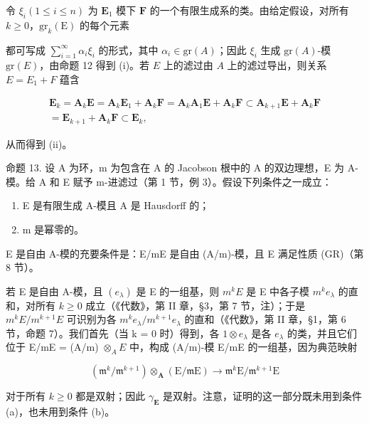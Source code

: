 	令 \(\xi_{i}(1\leqslant i\leqslant n)\) 为 \(\mathbf{E}_1\) 模下 \(\mathbf{F}\) 的一个有限生成系的类。由给定假设，对所有 \(k\geqslant 0\)，\(\mathrm{gr}_k(\mathrm{E})\) 的每个元素

	都可写成 \(\sum_{i=1}^{\infty} \alpha_i \xi_i\) 的形式，其中 \(\alpha_i \in \mathrm{gr}(A)\)；因此 \(\xi_i\) 生成 \(\mathrm{gr}(A)\)-模 \(\mathrm{gr}(E)\)，由命题 12 得到 (i)。若 \(E\) 上的滤过由 \(A\) 上的滤过导出，则关系 \(E = E_1 + F\) 蕴含

\[
\begin{array}{r} \mathbf {E} _ {k} = \mathbf {A} _ {k} \mathbf {E} = \mathbf {A} _ {k} \mathbf {E} _ {1} + \mathbf {A} _ {k} \mathbf {F} = \mathbf {A} _ {k} \mathbf {A} _ {1} \mathbf {E} + \mathbf {A} _ {k} \mathbf {F} \subset \mathbf {A} _ {k + 1} \mathbf {E} + \mathbf {A} _ {k} \mathbf {F} \\ = \mathbf {E} _ {k + 1} + \mathbf {A} _ {k} \mathbf {F} \subset \mathbf {E} _ {k}, \end{array}
\]

从而得到 (ii)。

命题 13. 设 A 为环，m 为包含在 A 的 Jacobson 根中的 A 的双边理想，E 为 A-模。给 A 和 E 赋予 m-进滤过（第 1 节，例 3）。假设下列条件之一成立：

\begin{enumerate}
\def\labelenumi{(\alph{enumi})}
\item
  E 是有限生成 A-模且 A 是 Hausdorff 的；
\item
  m 是幂零的。
\end{enumerate}

E 是自由 A-模的充要条件是：E/mE 是自由 (A/m)-模，且 E 满足性质 (GR)（第 8 节）。

	若 E 是自由 A-模，且 \((e_{\lambda})\) 是 E 的一组基，则 \(m^{k}E\) 是 E 中各子模 \(m^{k}e_{\lambda}\) 的直和，对所有 \(k \geqslant 0\) 成立（《代数》，第 II 章，§3，第 7 节，注）；于是 \(m^{k}E/m^{k+1}E\) 可识别为各 \(m^{k}e_{\lambda}/m^{k+1}e_{\lambda}\) 的直和（《代数》，第 II 章，§1，第 6 节，命题 7）。我们首先（当 k = 0 时）得到，各 \(1 \otimes e_{\lambda}\) 是各 \(e_{\lambda}\) 的类，并且它们位于 E/mE = (A/m) \(\otimes_{A} E\) 中，构成 (A/m)-模 E/mE 的一组基，因为典范映射

\[
\left(\mathfrak {m} ^ {k} / \mathfrak {m} ^ {k + 1}\right) \otimes_ {\mathbf {A}} (\mathrm{E} / \mathfrak {m} \mathrm{E}) \rightarrow \mathfrak {m} ^ {k} \mathrm{E} / \mathfrak {m} ^ {k + 1} \mathrm{E}
\]

	对于所有 \(k \geqslant 0\) 都是双射；因此 \(\gamma_{\mathbf{E}}\) 是双射。注意，证明的这一部分既未用到条件 (a)，也未用到条件 (b)。

